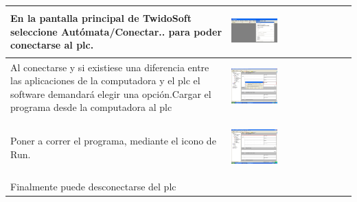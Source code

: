 \begin{table}[H]
\centering
\renewcommand*{\arraystretch}{0.01}
\begin{tabular}{*{2}{m{}}}
\hline
    En la pantalla principal de TwidoSoft seleccione 
Autómata/Conectar.. para poder conectarse al \gls{plc}.
    &\begin{center}
      \includegraphics[width=0.4\textwidth]
	{Anexos/images/twidosoft.PNG}
    \end{center}\\
\hline
    Al conectarse y si existiese una diferencia entre las aplicaciones 
de la computadora y el \gls{plc} el software demandará elegir una opción.Cargar 
el programa desde la computadora al \gls{plc}
    &\begin{center}
      \includegraphics[width=0.4\textwidth]
	{Anexos/images/twidosoftcargar.PNG}
    \end{center}\\
\hline
    Poner a correr el programa, mediante el icono de Run.
    &\begin{center}
      \includegraphics[width=0.4\textwidth]
	{Anexos/images/twidosoftrun.PNG}
    \end{center}\\
\hline
  Finalmente puede desconectarse del \gls{plc}

\end{tabular}
\end{table}
